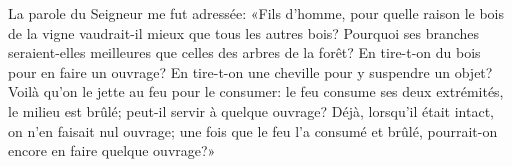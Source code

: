 La parole du Seigneur me fut adressée:
	«Fils d’homme, pour quelle raison le bois de la vigne
		vaudrait-il mieux que tous les autres bois?
	Pourquoi ses branches seraient-elles meilleures
		que celles des arbres de la forêt?
En tire-t-on du bois pour en faire un ouvrage?
En tire-t-on une cheville pour y suspendre un objet?
Voilà qu’on le jette au feu pour le consumer:
	le feu consume ses deux extrémités, le milieu est brûlé;
	peut-il servir à quelque ouvrage?
Déjà, lorsqu’il était intact, on n’en faisait nul ouvrage;
	une fois que le feu l’a consumé et brûlé,
	pourrait-on encore en faire quelque ouvrage?»
